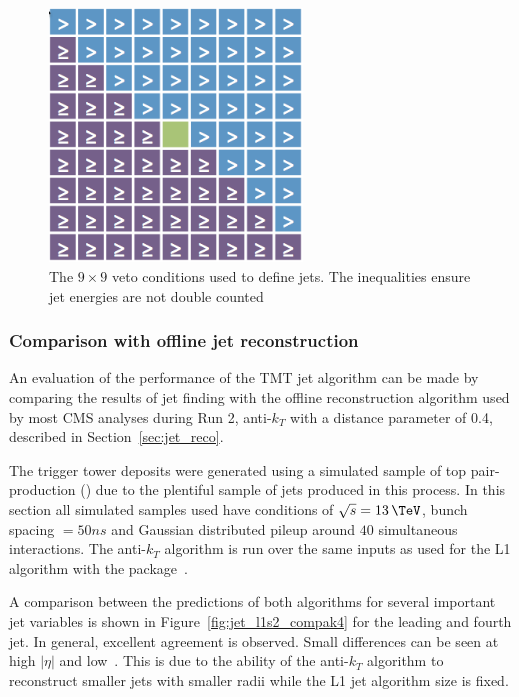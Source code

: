 \begin{figure}
\centering
    \includegraphics[width=0.6\textwidth]{./Figures/triggerUpgrade/mask.png}
  \caption{The $9\times9$ veto conditions used to define jets. The inequalities ensure
  jet energies are not double counted}
  \label{mask}
\end{figure}

\subsubsection{Comparison with offline jet reconstruction}

An evaluation of the performance of the TMT jet algorithm can be made by comparing
the results of jet finding with the offline reconstruction algorithm used by 
most CMS analyses during Run 2, anti-$k_T$ with a distance
parameter of 0.4, described in Section~\ref{sec:jet_reco}. 

The trigger tower deposits were generated using a simulated sample of 
top pair-production (\ttj) due to the plentiful sample of jets produced in this process. 
In this section all simulated samples used have conditions 
of $\sqrt{s} = 13\,\TeV$, bunch spacing $ = 50ns$ and Gaussian distributed pileup around $40$ simultaneous interactions. 
The anti-$k_T$ algorithm is run over the same inputs as
used for the L1 algorithm with the \FASTJET package~\cite{fastjet}.

A comparison between the predictions of both algorithms for several important jet variables is shown in 
Figure~\ref{fig:jet_l1s2_compak4} for the leading and fourth jet. In general, excellent agreement is observed. 
Small differences can be seen at high $|\eta|$ and low~\pt. This is due to the ability 
of the anti-$k_T$ algorithm to reconstruct smaller jets with smaller radii while the L1 jet
algorithm size is fixed.


